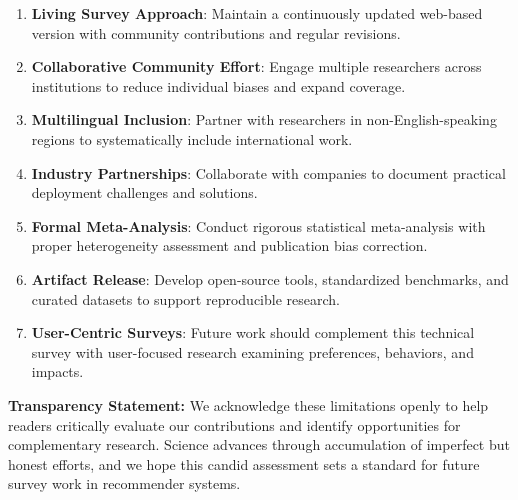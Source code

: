 \begin{enumerate}
    \item \textbf{Living Survey Approach}: Maintain a continuously updated web-based version with community contributions and regular revisions.
    
    \item \textbf{Collaborative Community Effort}: Engage multiple researchers across institutions to reduce individual biases and expand coverage.
    
    \item \textbf{Multilingual Inclusion}: Partner with researchers in non-English-speaking regions to systematically include international work.
    
    \item \textbf{Industry Partnerships}: Collaborate with companies to document practical deployment challenges and solutions.
    
    \item \textbf{Formal Meta-Analysis}: Conduct rigorous statistical meta-analysis with proper heterogeneity assessment and publication bias correction.
    
    \item \textbf{Artifact Release}: Develop open-source tools, standardized benchmarks, and curated datasets to support reproducible research.
    
    \item \textbf{User-Centric Surveys}: Future work should complement this technical survey with user-focused research examining preferences, behaviors, and impacts.
\end{enumerate}

\textbf{Transparency Statement:} We acknowledge these limitations openly to help readers critically evaluate our contributions and identify opportunities for complementary research. Science advances through accumulation of imperfect but honest efforts, and we hope this candid assessment sets a standard for future survey work in recommender systems.

